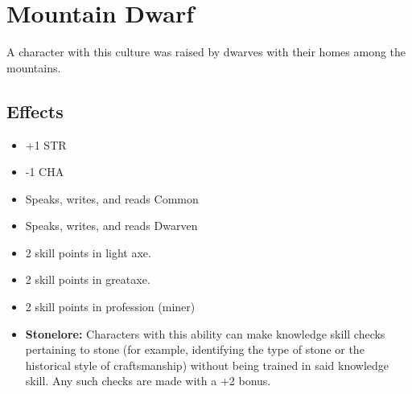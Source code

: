 \section{Mountain Dwarf}\label{culture:mountain-dwarf}
A character with this culture was raised by dwarves with their homes among the
mountains.

\subsection{Effects}
\begin{itemize}
    \item +1 STR
    \item -1 CHA
    \item Speaks, writes, and reads Common
    \item Speaks, writes, and reads Dwarven
    \item 2 skill points in light axe.
    \item 2 skill points in greataxe.
    \item 2 skill points in profession (miner)
    \item \textbf{Stonelore:} Characters with this ability can make knowledge
        skill checks pertaining to stone (for example, identifying the type of
        stone or the historical style of craftsmanship) without being trained
        in said knowledge skill. Any such checks are made with a +2 bonus.
\end{itemize}
